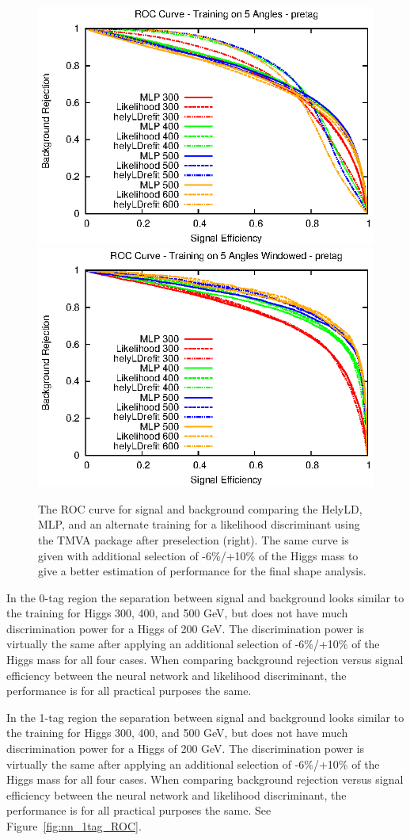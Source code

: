 \begin{figure}[htb!]
\begin{center}
\centerline{
\includegraphics[width=0.49\linewidth]{Optimization/pretag_ROC_full_5.eps}
\includegraphics[width=0.49\linewidth]{Optimization/pretag_ROC_win_5.eps}
}
\caption{The ROC curve for signal and background comparing the HelyLD, MLP, and an alternate training for a likelihood discriminant using the TMVA package after preselection (right).  The same curve is given with additional selection of -6\%/+10\% of the Higgs mass to give a better estimation of performance for the final shape analysis.
}
\label{fig:windowcuts}
\end{center}
\end{figure}

In the 0-tag region the separation between signal and background looks similar to the training for Higgs 300, 400, and 500 GeV, but does not have much discrimination power for a Higgs of 200 GeV.  The discrimination power is virtually the same after applying an additional selection of -6\%/+10\% of the Higgs mass for all four cases. When comparing background rejection versus signal efficiency between the neural network and likelihood discriminant, the performance is for all practical purposes the same.

In the 1-tag region the separation between signal and background looks similar to the training for Higgs 300, 400, and 500 GeV, but does not have much discrimination power for a Higgs of 200 GeV.  The discrimination power is virtually the same after applying an additional selection of -6\%/+10\% of the Higgs mass for all four cases. When comparing background rejection versus signal efficiency between the neural network and likelihood discriminant, the performance is for all practical purposes the same. See Figure~\ref{fig:nn_1tag_ROC}.

